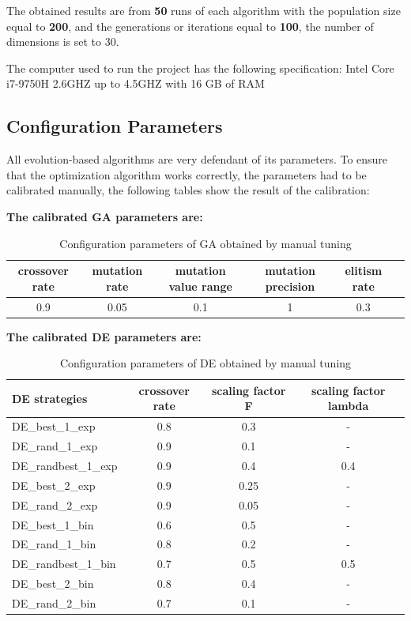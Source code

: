 \documentclass[12pt]{article}
\begin{document}
    The obtained results are from \textbf{50} runs of each algorithm with the population size equal to \textbf{200}, and the generations or iterations equal to \textbf{100}, the number of dimensions is set to 30.

The computer used to run the project has the following specification: Intel Core i7-9750H 2.6GHZ up to 4.5GHZ with 16 GB of RAM

  
      
\subsection{Configuration Parameters}
All evolution-based algorithms are very defendant of its parameters. To ensure that the optimization algorithm works correctly,  the parameters had to be calibrated manually,
the following tables show the result of the calibration:






\textbf{The calibrated GA parameters are:}
\begin{table}[H]    
\centering
\footnotesize
\begin{tabular}{cccccc}

\hline
crossover rate&    mutation rate&    mutation value range&     mutation precision&     elitism rate\\
\hline

0.9&    0.05&    0.1&    1&    0.3&\\

\hline 
\end{tabular} 

\caption{Configuration parameters of GA obtained by manual tuning} 
\end{table}



\textbf{The calibrated DE parameters are:}

\begin{table}[H]    
\centering
\small 
\begin{tabular}{lccc}

\hline
DE strategies & crossover rate& scaling factor F& scaling factor lambda\\
\hline 
DE\_best\_1\_exp & 0.8 &    0.3&    - \\
DE\_rand\_1\_exp& 0.9&    0.1&    - \\
DE\_randbest\_1\_exp& 0.9&    0.4&    0.4 \\
DE\_best\_2\_exp& 0.9&    0.25&    - \\
DE\_rand\_2\_exp& 0.9&    0.05&    - \\
DE\_best\_1\_bin& 0.6&    0.5&    - \\
DE\_rand\_1\_bin& 0.8&    0.2&    - \\
DE\_randbest\_1\_bin& 0.7&    0.5&    0.5\\
DE\_best\_2\_bin& 0.8&    0.4&    - \\
DE\_rand\_2\_bin& 0.7&    0.1&    - \\
\hline 
\end{tabular} 
\caption{Configuration parameters of DE obtained by manual tuning} 
\end{table}
\end{document}
